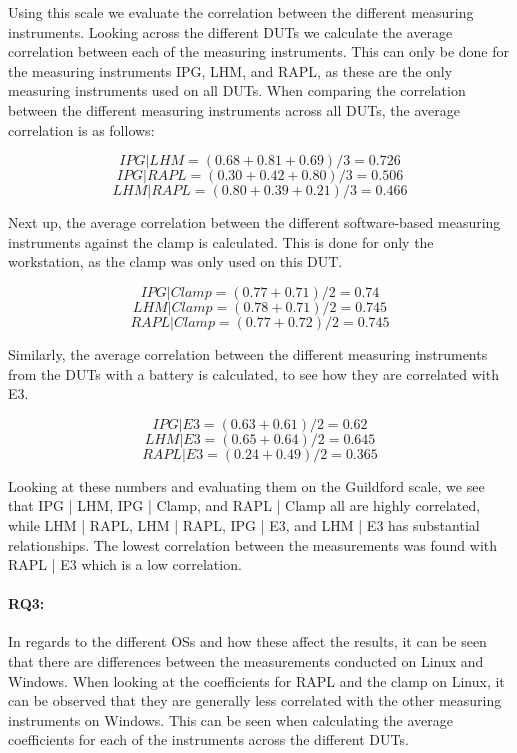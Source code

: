 

Using this scale we evaluate the correlation between the different measuring instruments. Looking across the different DUTs we calculate the average correlation between each of the measuring instruments. This can only be done for the measuring instruments IPG, LHM, and RAPL, as these are the only measuring instruments used on all DUTs. When comparing the correlation between the different measuring instruments across all DUTs, the average correlation is as follows:

$$IPG | LHM = (0.68+0.81+0.69)/3 = 0.726$$
$$IPG | RAPL = (0.30+0.42+0.80)/3 = 0.506$$
$$LHM | RAPL = (0.80+0.39+0.21)/3 = 0.466$$

Next up, the average correlation between the different software-based measuring instruments against the clamp is calculated. This is done for only the workstation, as the clamp was only used on this DUT.

$$IPG | Clamp = (0.77+0.71)/2 = 0.74$$
$$LHM | Clamp = (0.78+0.71)/2 = 0.745$$
$$RAPL | Clamp = (0.77+0.72)/2 = 0.745$$

Similarly, the average correlation between the different measuring instruments from the DUTs with a battery is calculated, to see how they are correlated with E3.

$$IPG | E3 = (0.63+0.61)/2 = 0.62$$
$$LHM | E3 = (0.65+0.64)/2 = 0.645$$
$$RAPL | E3 = (0.24+0.49)/2 = 0.365$$

Looking at these numbers and evaluating them on the Guildford scale, we see that IPG | LHM, IPG | Clamp, and RAPL | Clamp all are highly correlated, while LHM | RAPL, LHM | RAPL, IPG | E3, and LHM | E3 has substantial relationships. The lowest correlation between the measurements was found with RAPL | E3 which is a low correlation.

\paragraph{RQ3:} In regards to the different OSs and how these affect the results, it can be seen that there are differences between the measurements conducted on Linux and Windows. When looking at the coefficients for RAPL and the clamp on Linux, it can be observed that they are generally less correlated with the other measuring instruments on Windows. This can be seen when calculating the average coefficients for each of the instruments across the different DUTs.

